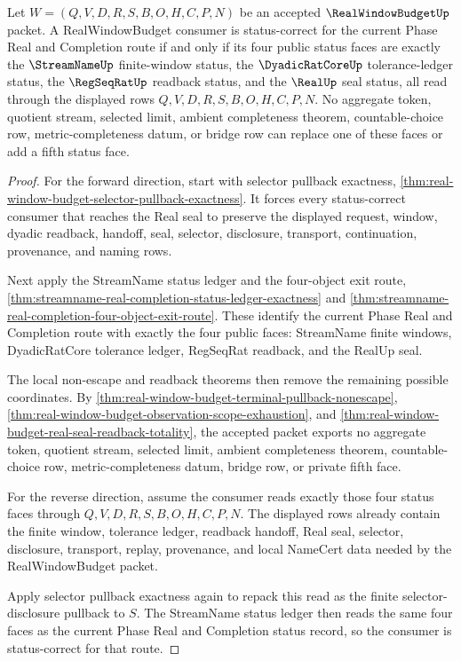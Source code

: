 \begin{theorem}
\label{thm:real-window-budget-open-phase-four-face-status-pullback}
Let $W=(Q,V,D,R,S,B,O,H,C,P,N)$ be an accepted $\RealWindowBudgetUp$ packet.
A RealWindowBudget consumer is status-correct for the current Phase Real and
Completion route if and only if its four public status faces are exactly the
$\StreamNameUp$ finite-window status, the $\DyadicRatCoreUp$ tolerance-ledger
status, the $\RegSeqRatUp$ readback status, and the $\RealUp$ seal status, all
read through the displayed rows $Q,V,D,R,S,B,O,H,C,P,N$. No aggregate token,
quotient stream, selected limit, ambient completeness theorem, countable-choice
row, metric-completeness datum, or bridge row can replace one of these faces or
add a fifth status face.
\end{theorem}
\begin{proof}
For the forward direction, start with selector pullback exactness,
\autoref{thm:real-window-budget-selector-pullback-exactness}. It forces every
status-correct consumer that reaches the Real seal to preserve the displayed
request, window, dyadic readback, handoff, seal, selector, disclosure, transport,
continuation, provenance, and naming rows.

Next apply the StreamName status ledger and the four-object exit route,
\autoref{thm:streamname-real-completion-status-ledger-exactness} and
\autoref{thm:streamname-real-completion-four-object-exit-route}. These identify
the current Phase Real and Completion route with exactly the four public faces:
StreamName finite windows, DyadicRatCore tolerance ledger, RegSeqRat readback,
and the RealUp seal.

The local non-escape and readback theorems then remove the remaining possible
coordinates. By
\autoref{thm:real-window-budget-terminal-pullback-nonescape},
\autoref{thm:real-window-budget-observation-scope-exhaustion}, and
\autoref{thm:real-window-budget-real-seal-readback-totality}, the accepted
packet exports no aggregate token, quotient stream, selected limit, ambient
completeness theorem, countable-choice row, metric-completeness datum, bridge
row, or private fifth face.

For the reverse direction, assume the consumer reads exactly those four status
faces through $Q,V,D,R,S,B,O,H,C,P,N$. The displayed rows already contain the
finite window, tolerance ledger, readback handoff, Real seal, selector,
disclosure, transport, replay, provenance, and local NameCert data needed by the
RealWindowBudget packet.

Apply selector pullback exactness again to repack this read as the finite
selector-disclosure pullback to $S$. The StreamName status ledger then reads the
same four faces as the current Phase Real and Completion status record, so the
consumer is status-correct for that route.
\end{proof}

